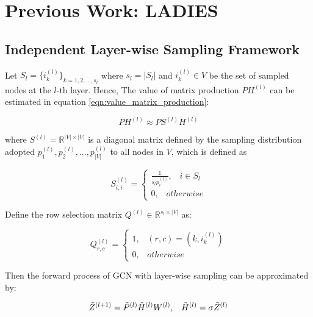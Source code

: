 \chapter{Previous Work: LADIES}
\section{Independent Layer-wise Sampling Framework}

Let $S_l = \{i_k^{(l)}\}_{k = 1, 2, ..., s_l}$ where $s_l = |S_l|$ and $i_k^{(l)} \in V$ be the set of sampled nodes at the $l$-th layer. Hence,  The value of matrix production $PH^{(l)}$ can be estimated in equation \ref{eqn:value_matrix_production}:

\begin{equation}
    PH^{(l)} \approx PS^{(l)}H^{(l)}
    \label{eqn:value_matrix_production}
\end{equation}

where $S^{(l)} = \mathbb{R} ^{|V|\times|V|}$ is a diagonal matrix defined by the sampling distribution adopted $p_1^{(l)}, p_2^{(l)}, ..., p_{|V|}^{(l)}$ to all nodes in $V$, which is defined as

\begin{equation}
    S_{i,i}^{(l)} = \left\{
    \begin{array}{ll}
        \frac{1}{s_l p_i^{(l)}}, \;\;\; i \in S_l\\
        0, \;\;\; otherwise
    \end{array}
\right.
\end{equation}

Define the row selection matrix $Q^{(l)} \in \mathbb{R}^{s_l \times |V|}$ as:

\begin{equation}
    Q_{r, c}^{(l)} = \left\{
        \begin{array}{ll}
            1, \;\;\; (r, c) = (k, i_k^{(l)})\\
            0, \;\;\; otherwise
        \end{array}
    \right.
\end{equation}

Then the forward process of GCN with layer-wise sampling can be approximated by:

\begin{equation}
    \Tilde{Z}^{(l+1)} = \Tilde{P}^{(l)}\Tilde{H}^{(l)}W^{(l)},\;\;\; \Tilde{H}^{(l)} = \sigma{\Tilde{Z}^{(l)}}
\end{equation}

